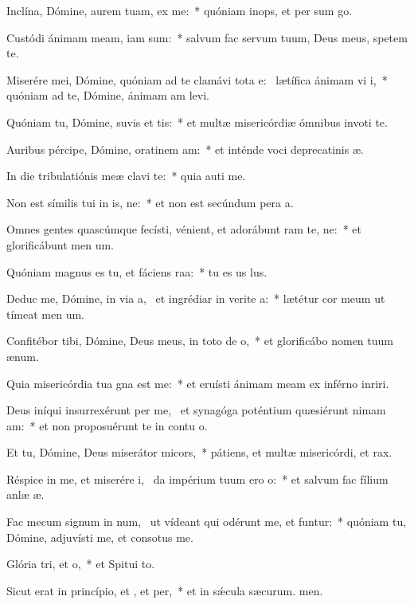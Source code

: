 \item Inclína, Dómine, aurem tuam,  ex me:~* quóniam inops, et per sum go.
\item Custódi ánimam meam, iam  sum:~* salvum fac servum tuum, Deus meus, spetem  te.
\item Miserére mei, Dómine, quóniam ad te clamávi tota e:~\pscross{} lætífica ánimam vi i,~* quóniam ad te, Dómine, ánimam am levi.
\item Quóniam tu, Dómine, suvis et tis:~* et multæ misericórdiæ ómnibus invoti te.
\item Auribus pércipe, Dómine, oratinem am:~* et inténde voci deprecatinis æ.
\item In die tribulatiónis meæ clavi  te:~* quia auti me.
\item Non est símilis tui in is, ne:~* et non est secúndum pera a.
\item Omnes gentes quascúmque fecísti, vénient, et adorábunt ram te, ne:~* et glorificábunt men um.
\item Quóniam magnus es tu, et fáciens raa:~* tu es us lus.
\item Deduc me, Dómine, in via a,~\pscross{} et ingrédiar in verite a:~* lætétur cor meum ut tímeat men um.
\item Confitébor tibi, Dómine, Deus meus, in toto de o,~* et glorificábo nomen tuum  ænum.
\item Quia misericórdia tua gna est  me:~* et eruísti ánimam meam ex inférno inriri.
\item Deus iníqui insurrexérunt per me,~\pscross{} et synagóga poténtium quæsiérunt nimam am:~* et non proposuérunt te in contu o.
\item Et tu, Dómine, Deus miserátor  micors,~* pátiens, et multæ misericórdi, et rax.
\item Réspice in me, et miserére i,~\pscross{} da impérium tuum ero o:~* et salvum fac fílium anlæ æ.
\item Fac mecum signum in num,~\pscross{} ut vídeant qui odérunt me, et funtur:~* quóniam tu, Dómine, adjuvísti me, et consotus  me.
\item Glória tri, et o,~* et Spitui to.
\item Sicut erat in princípio, et , et per,~* et in sǽcula sæcurum. men.
